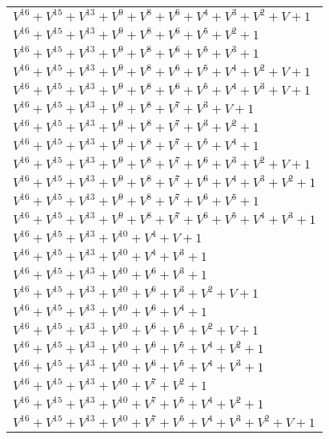 \documentclass[12pt]{article}
\begin{document}
\begin{adjustwidth}{-4cm}{}
\begin{center}
\begin{longtable}{|l|}
$V^{16}  +V^{15}  +V^{13}  +V^{9}  +V^{8}  +V^{6}  +V^{4}  +V^{3}  +V^{2}  + V + 1$ \\
$V^{16}  +V^{15}  +V^{13}  +V^{9}  +V^{8}  +V^{6}  +V^{5}  +V^{2}  + 1$ \\
$V^{16}  +V^{15}  +V^{13}  +V^{9}  +V^{8}  +V^{6}  +V^{5}  +V^{3}  + 1$ \\
$V^{16}  +V^{15}  +V^{13}  +V^{9}  +V^{8}  +V^{6}  +V^{5}  +V^{4}  +V^{2}  + V + 1$ \\
$V^{16}  +V^{15}  +V^{13}  +V^{9}  +V^{8}  +V^{6}  +V^{5}  +V^{4}  +V^{3}  + V + 1$ \\
$V^{16}  +V^{15}  +V^{13}  +V^{9}  +V^{8}  +V^{7}  +V^{3}  + V + 1$ \\
$V^{16}  +V^{15}  +V^{13}  +V^{9}  +V^{8}  +V^{7}  +V^{3}  +V^{2}  + 1$ \\
$V^{16}  +V^{15}  +V^{13}  +V^{9}  +V^{8}  +V^{7}  +V^{5}  +V^{4}  + 1$ \\
$V^{16}  +V^{15}  +V^{13}  +V^{9}  +V^{8}  +V^{7}  +V^{6}  +V^{3}  +V^{2}  + V + 1$ \\
$V^{16}  +V^{15}  +V^{13}  +V^{9}  +V^{8}  +V^{7}  +V^{6}  +V^{4}  +V^{3}  +V^{2}  + 1$ \\
$V^{16}  +V^{15}  +V^{13}  +V^{9}  +V^{8}  +V^{7}  +V^{6}  +V^{5}  + 1$ \\
$V^{16}  +V^{15}  +V^{13}  +V^{9}  +V^{8}  +V^{7}  +V^{6}  +V^{5}  +V^{4}  +V^{3}  + 1$ \\
$V^{16}  +V^{15}  +V^{13}  +V^{10}  +V^{4}  + V + 1$ \\
$V^{16}  +V^{15}  +V^{13}  +V^{10}  +V^{4}  +V^{3}  + 1$ \\
$V^{16}  +V^{15}  +V^{13}  +V^{10}  +V^{6}  +V^{3}  + 1$ \\
$V^{16}  +V^{15}  +V^{13}  +V^{10}  +V^{6}  +V^{3}  +V^{2}  + V + 1$ \\
$V^{16}  +V^{15}  +V^{13}  +V^{10}  +V^{6}  +V^{4}  + 1$ \\
$V^{16}  +V^{15}  +V^{13}  +V^{10}  +V^{6}  +V^{5}  +V^{2}  + V + 1$ \\
$V^{16}  +V^{15}  +V^{13}  +V^{10}  +V^{6}  +V^{5}  +V^{4}  +V^{2}  + 1$ \\
$V^{16}  +V^{15}  +V^{13}  +V^{10}  +V^{6}  +V^{5}  +V^{4}  +V^{3}  + 1$ \\
$V^{16}  +V^{15}  +V^{13}  +V^{10}  +V^{7}  +V^{2}  + 1$ \\
$V^{16}  +V^{15}  +V^{13}  +V^{10}  +V^{7}  +V^{5}  +V^{4}  +V^{2}  + 1$ \\
$V^{16}  +V^{15}  +V^{13}  +V^{10}  +V^{7}  +V^{5}  +V^{4}  +V^{3}  +V^{2}  + V + 1$ \\

\end{longtable}
\end{center}
\end{adjustwidth}
\end{document}
